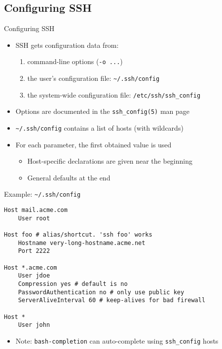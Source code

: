 \documentclass[11pt,final,usepdftitle=false]{beamer}
\newcommand{\tilda}{\textasciitilde{}}
\begin{document}
\subsection{Configuring SSH}
\begin{frame}{Configuring SSH}
	\begin{itemize}
		\item SSH gets configuration data from:
			\begin{enumerate}
				\item command-line options (\texttt{-o ...})
				\item the user's configuration file: \texttt{\tilda/.ssh/config}
				\item the system-wide configuration file: \texttt{/etc/ssh/ssh\_config}
			\end{enumerate}
		\hbr
		\item Options are documented in the \texttt{ssh\_config(5)} man page
		\hbr
		\item \texttt{\tilda/.ssh/config} contains a list of hosts (with wildcards)
		\hbr
		\item For each parameter, the first obtained value is used\\
			\begin{itemize}
				\item Host-specific declarations are given near the beginning
				\item General defaults at the end
			\end{itemize}
	\end{itemize}
\end{frame}

\begin{frame}[fragile]{Example: \texttt{\tilda/.ssh/config}}
\begin{lstlisting}[basicstyle=\ttfamily\small,escapeinside={||}]
Host mail.acme.com
    User root

Host foo # alias/shortcut. 'ssh foo' works
    Hostname very-long-hostname.acme.net
    Port 2222

Host *.acme.com
    User jdoe
    Compression yes # default is no
    PasswordAuthentication no # only use public key
    ServerAliveInterval 60 # keep-alives for bad firewall

Host *
    User john
\end{lstlisting}
\begin{itemize}
	\item Note: \texttt{bash-completion} can auto-complete using \texttt{ssh\_config} hosts
\end{itemize}
\end{frame}
\end{document}
